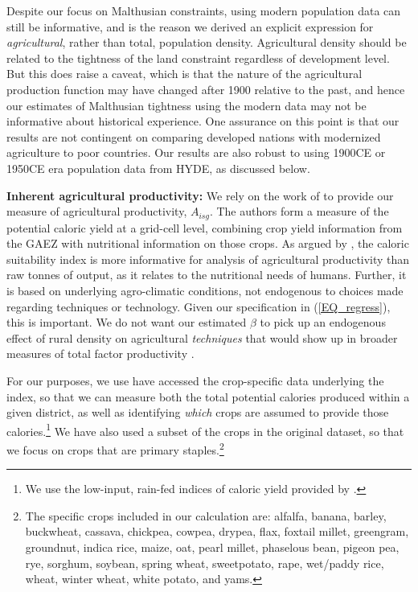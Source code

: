 \documentclass[11pt]{article}
\begin{document}
Despite our focus on Malthusian constraints, using modern population data can still be informative, and is the reason we derived an explicit expression for \textit{agricultural}, rather than total, population density. Agricultural density should be related to the tightness of the land constraint regardless of development level. But this does raise a caveat, which is that the nature of the agricultural production function may have changed after 1900 relative to the past, and hence our estimates of Malthusian tightness using the modern data may not be informative about historical experience. One assurance on this point is that our results are not contingent on comparing developed nations with modernized agriculture to poor countries. Our results are also robust to using 1900CE or 1950CE era population data from HYDE, as discussed below.

\vspace{.5cm}\noindent\textbf{Inherent agricultural productivity:} We rely on the work of \citet{galorozak2016} to provide our measure of agricultural productivity, $A_{isg}$. The authors form a measure of the potential caloric yield at a grid-cell level, combining crop yield information from the GAEZ with nutritional information on those crops. As argued by \citet{galorozak2016}, the caloric suitability index is more informative for analysis of agricultural productivity than raw tonnes of output, as it relates to the nutritional needs of humans. Further, it is based on underlying agro-climatic conditions, not endogenous to choices made regarding techniques or technology. Given our specification in (\ref{EQ_regress}), this is important. We do not want our estimated $\beta$ to pick up an endogenous effect of rural density on agricultural \textit{techniques} that would show up in broader measures of total factor productivity \citep{Boserup1965}.

For our purposes, we use have accessed the crop-specific data underlying the \citet{galorozak2016} index, so that we can measure both the total potential calories produced within a given district, as well as identifying \textit{which} crops are assumed to provide those calories.\footnote{We use the low-input, rain-fed indices of caloric yield provided by \citet{galorozak2016}.} We have also used a subset of the crops in the original \citet{galorozak2016} dataset, so that we focus on crops that are primary staples.\footnote{The specific crops included in our calculation are: alfalfa, banana, barley, buckwheat, cassava, chickpea, cowpea, drypea, flax, foxtail millet, greengram, groundnut, indica rice, maize, oat, pearl millet, phaselous bean, pigeon pea, rye, sorghum, soybean, spring wheat, sweetpotato, rape, wet/paddy rice, wheat, winter wheat, white potato, and yams.} 
\end{document}
